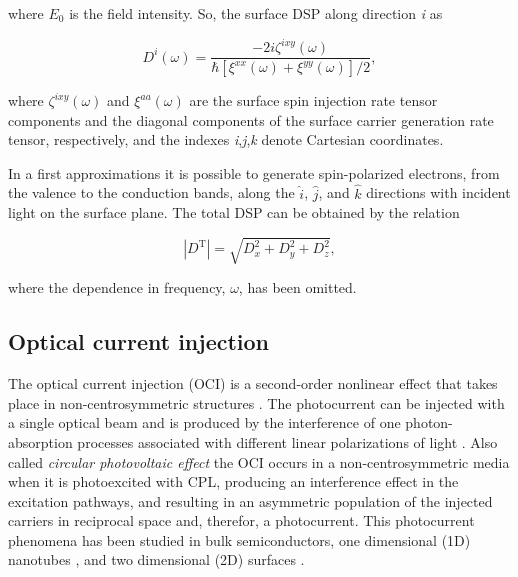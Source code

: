 \documentclass[aps,pra,11pt,tightenlines,showpacs,superscriptaddress,groupedaddress]{revtex4-1}
\begin{document}
\noindent where $E_{0}$ is the field intensity.
So,  the surface DSP along
direction \emph{i} as

\begin{equation}
    D^{i}(\omega) = \frac{-2i \zeta^{ixy} (\omega)}{\hbar \left[
    \xi^{xx}(\omega) + \xi^{yy}(\omega) \right] /2 } \label{eq:D^i},
\end{equation}

\noindent where $\zeta^{ixy} (\omega)$ and $\xi^{aa}(\omega)$ are the surface
spin injection rate tensor components and the diagonal components of the
surface carrier generation rate tensor, respectively, and the indexes
\emph{i},\emph{j},\emph{k} denote Cartesian coordinates.

 In a first approximations it is 
possible to generate spin-polarized electrons, from the valence to the
conduction bands, along the $\hat{i}$, $\hat{j}$, and $\hat{k}$ directions with
incident light on the surface plane. The total DSP can be obtained by the
relation

\begin{equation}
    \left|{D^{\text{T}}}\right| = \sqrt{  D_{x}^{2} +  D_{y}^{2} +  D_{z}^{2} },
\end{equation}

\noindent where the dependence in frequency, $\omega$, has been omitted.

    \subsection{Optical current injection}

The optical current injection (OCI) is a second-order nonlinear effect that
takes place in non-centrosymmetric structures \cite{nastos2006optical,
cabellos2011optical,bhat2005excitonic,fraser1999quantum}. The photocurrent can
be injected with a single optical beam and is produced by the interference of
one photon-absorption processes associated with different linear polarizations
of light \cite{sipe2000second}. Also called  \emph{circular photovoltaic
effect} the OCI occurs in a non-centrosymmetric media when it is photoexcited
with CPL, producing an interference effect in the excitation pathways, and
resulting in an asymmetric population of the injected carriers in reciprocal
space and, therefor, a photocurrent. This photocurrent phenomena has been
studied in bulk semiconductors, one dimensional (1D) nanotubes
\cite{mele2000coherent,kral2000photogalvanic}, and two dimensional (2D)
surfaces \cite{mele2000coherent}.
\end{document}
